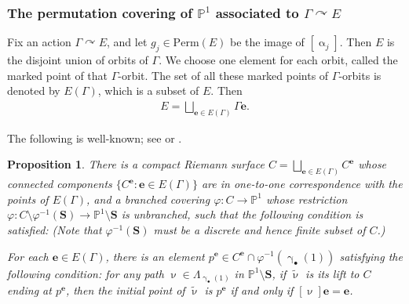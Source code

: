 \documentclass[11pt,b5paper,notitlepage]{article}
\theoremstyle{definition}
\theoremstyle{plain}
\newtheorem{pp}[df]{Proposition}
\newcommand{\wtd}{\widetilde}
\newcommand{\mbf}{\mathbf}
\newcommand{\blt}{\bullet}
\newcommand{\Pbb}{\mathbb P}
\newcommand{\Sbf}{\mathbf{S}}
\newcommand{\Perm}{\mathrm{Perm}}
\numberwithin{equation}{subsection}
\begin{document}
\subsubsection{The permutation covering of $\Pbb^1$ associated to $\Gamma\curvearrowright E$}




Fix an action $\Gamma\curvearrowright E$, and let $g_j\in\Perm(E)$ be the image of $[\upalpha_j]$. Then $E$ is the disjoint union of orbits of $\Gamma$. We choose one element for each orbit, called the marked point of that $\Gamma$-orbit. The set of all these marked points of $\Gamma$-orbits is denoted by $E(\Gamma)$,  which is a subset of $E$. Then
\begin{align*}
E=\bigsqcup_{\mbf e\in E(\Gamma)}\Gamma \mbf e.	
\end{align*}


The following is well-known; see  \cite[Sec. 4.2.2, Thm. 2]{Don} or \cite[Sec. 19b]{Ful}.


\begin{pp}\label{lb3}
There is a compact Riemann surface $C=\bigsqcup_{\mbf e\in E(\Gamma)}C^{\mbf e}$ whose connected components $\{C^{\mbf e}:\mbf e\in E(\Gamma)\}$ are in one-to-one correspondence with the points of $E(\Gamma)$, and a branched covering $\varphi:C\rightarrow\Pbb^1$ whose restriction $\varphi:C\setminus\varphi^{-1}(\Sbf)\rightarrow\Pbb^1\setminus\Sbf$ is unbranched,  such that the following condition is satisfied: (Note that $\varphi^{-1}(\Sbf)$ must be a discrete and hence finite subset of $C$.) 

For each $\mbf e\in E(\Gamma)$, there is an element $p^{\mbf e}\in C^{\mbf e}\cap\varphi^{-1}(\upgamma_\blt(1))$ satisfying the following condition: for any path $\upnu\in\Lambda_{\upgamma_\blt(1)}$ in $\Pbb^1\setminus\Sbf$, if $\wtd\upnu$ is its lift to $C$ ending at $p^{\mbf e}$, then the initial point of $\wtd\upnu$ is $p^{\mbf e}$ if and only if $[\upnu]\mbf e=\mbf e$.
\end{pp}
\end{document}
